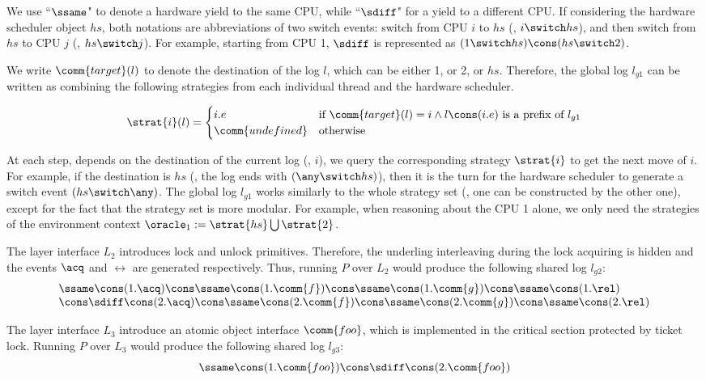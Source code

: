 We use ``$\ssame$" to denote a hardware yield to the same CPU, while
``$\sdiff$" for a yield to a different CPU.  If considering the
hardware scheduler object $hs$, both notations are abbreviations of
two switch events: switch from CPU $i$ to $hs$ (\ie, $i\switch hs$),
and then switch from $hs$ to CPU $j$ (\ie, $hs \switch j$).  For
example, starting from CPU 1, $\sdiff$ is represented as $(1\switch
hs) \cons (hs\switch 2)$.

We write $\comm{target}(l)$ to denote
the destination of the log $l$,
which can be either 1, or 2, or $hs$.
Therefore, the global log $l_{g1}$ can be written as combining the following strategies from each
individual thread and the hardware scheduler.
\begin{small}
\[
\strat{i} (l)=
\begin{cases}
i.e & \text{if } \comm{target}(l) = i \wedge
l\cons (i.e) \text{ is a prefix of } l_{g1} \\
\comm{undefined } & \text{otherwise}
\end{cases}
\]
\end{small}

At each step, depends on the destination of the current log
(\ie, $i$),
we query 
the corresponding strategy $\strat{i}$
 to get the next move of $i$.
For example, if the destination is $hs$
(\ie, the log ends with $(\any\switch hs)$),
then it is the turn for the hardware scheduler
to generate a switch event $(hs\switch \any)$.
The global log $l_{g1}$ works similarly
to the whole strategy set
(\ie, one can be constructed by the other one),
except for the fact that the strategy set is more modular.
For example, when reasoning about the CPU 1 alone,
we only need the strategies of the environment
context $\oracle_1 := \strat{hs} \bigcup \strat{2}$.

The layer interface $L_2$ introduces lock and unlock primitives.
Therefore, the underling interleaving during the lock acquiring is
hidden and the events $\acq$ and $\rel$ are generated respectively.
Thus, running $P$ over $L_2$ would produce the following shared log
$l_{g2}$:
{\small
\[
\begin{array}{l}
\ssame \cons (1.\acq) \cons
\ssame \cons (1.\comm{f}) \cons
\ssame \cons (1.\comm{g}) \cons
\ssame \cons (1.\rel) 
\\
\cons \sdiff \cons (2.\acq) \cons
\ssame \cons (2.\comm{f}) \cons
\ssame \cons (2.\comm{g}) \cons
\ssame \cons (2.\rel) 
\end{array}
\]
}

The layer interface $L_3$ introduce an atomic object interface
$\comm{foo}$, which is implemented in the critical section
protected by ticket lock.
Running $P$ over $L_3$ would produce the following shared log
$l_{g3}$:
{\small
\[
\ssame \cons (1.\comm{foo})
\cons \sdiff \cons (2.\comm{foo})
\]}

